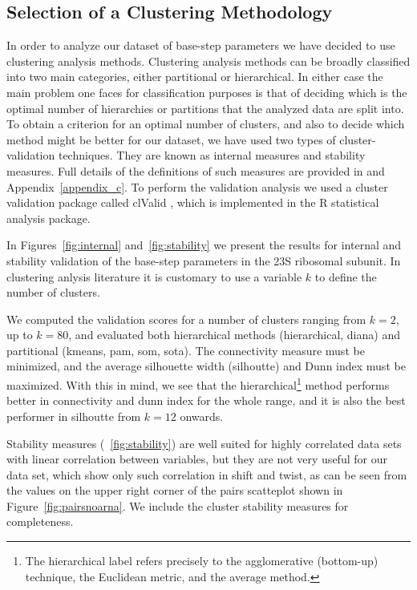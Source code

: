 \subsection{Selection of a Clustering Methodology} 
In  order to  analyze  our  dataset of  base-step  parameters we  have
decided  to  use  clustering  analysis methods.   Clustering  analysis
methods  can be broadly  classified into  two main  categories, either
partitional  or hierarchical.   In either  case the  main  problem one
faces for  classification purposes  is that of  deciding which  is the
optimal number of hierarchies or partitions that the analyzed data are
split into.  To obtain a  criterion for an optimal number of clusters,
and also  to decide which method  might be better for  our dataset, we
have used two types  of cluster-validation techniques.  They are known
as  internal measures  and stability  measures.  Full  details  of the
definitions  of   such  measures  are   provided  in  \cite{handl2005,
brock2008} and  Appendix~\ref{appendix_c}.  To perform  the validation
analysis  we   used  a  cluster  validation   package  called  clValid
\cite{brock2008},   which  is  implemented   in  the   R  \cite{rcite}
statistical analysis package.

In  Figures~\ref{fig:internal} and~\ref{fig:stability} we  present the
results  for  internal  and  stability  validation  of  the  base-step
parameters  in  the  23S  ribosomal  subunit.  In  clustering  anlysis
literature it is customary to use  a variable $k$ to define the number
of clusters.

We computed  the validation  scores for a  number of  clusters ranging
from  $k=2$, up  to $k=80$,  and evaluated  both  hierarchical methods
(hierarchical, diana)  and partitional (kmeans, pam,  som, sota).  The
connectivity  measure must  be minimized,  and the  average silhouette
width  (silhoutte) and  Dunn index  must be  maximized.  With  this in
mind,  we see  that the  hierarchical\footnote{The  hierarchical label
  refers  precisely to  the agglomerative  (bottom-up)  technique, the
  Euclidean metric, and the average method.} method performs better in
connectivity and  dunn index for the  whole range, and it  is also the
best performer in silhoutte from $k=12$ onwards.

Stability measures  (~\ref{fig:stability}) are well  suited for highly
correlated data sets with linear correlation between variables, but
they are not very useful for our data set,
which show  only such correlation in  shift and twist, as  can be seen
from  the values on  the upper  right corner  of the  pairs scatteplot
shown  in   Figure~\ref{fig:pairsnoarna}.   We  include   the  cluster
stability measures for completeness.

